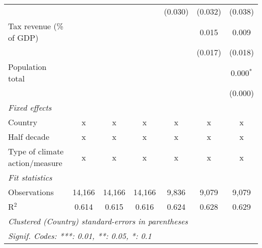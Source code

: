 \begin{tabular}{lcccccc}
                                                     &         &                &                & (0.030)        & (0.032)        & (0.038)\\   
   Tax revenue (\% of GDP)                           &         &                &                &                & 0.015          & 0.009\\   
                                                     &         &                &                &                & (0.017)        & (0.018)\\   
   Population total                                  &         &                &                &                &                & 0.000$^{*}$\\   
                                                     &         &                &                &                &                & (0.000)\\   
   \emph{Fixed effects}\\
   Country                                           & x       & x              & x              & x              & x              & x\\  
   Half decade                                       & x       & x              & x              & x              & x              & x\\  
   Type of climate action/measure                    & x       & x              & x              & x              & x              & x\\  
   \midrule \emph{Fit statistics}\\
   Observations                                      & 14,166  & 14,166         & 14,166         & 9,836          & 9,079          & 9,079\\  
   R$^2$                                             & 0.614   & 0.615          & 0.616          & 0.624          & 0.628          & 0.629\\  
   \midrule
   \multicolumn{7}{l}{\emph{Clustered (Country) standard-errors in parentheses}}\\
   \multicolumn{7}{l}{\emph{Signif. Codes: ***: 0.01, **: 0.05, *: 0.1}}\\
\end{tabular}
\par\endgroup


